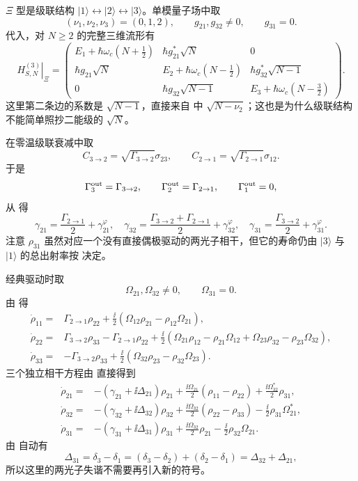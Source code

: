 \clearpage
\begin{exbox}[$\Xi$ 型]
$\Xi$ 型是级联结构 $|1\rangle\leftrightarrow|2\rangle\leftrightarrow|3\rangle$。单模量子场中取
\[
(\nu_1,\nu_2,\nu_3)=(0,1,2),
\qquad
g_{21},g_{32}\ne0,
\qquad
g_{31}=0.
\]
代入，对 $N\ge2$ 的完整三维流形有
\[
\left.H_{S,N}^{(3)}\right|_{\Xi}=
\begin{pmatrix}
E_1+\hbar\omega_c(N+\tfrac12)&\hbar g_{21}^*\sqrt N&0\\
\hbar g_{21}\sqrt N&E_2+\hbar\omega_c(N-\tfrac12)&\hbar g_{32}^*\sqrt{N-1}\\
0&\hbar g_{32}\sqrt{N-1}&E_3+\hbar\omega_c(N-\tfrac32)
\end{pmatrix}.
\]
这里第二条边的系数是 $\sqrt{N-1}$，直接来自 中 $\sqrt{N-\nu_2}$；这也是为什么级联结构不能简单照抄二能级的 $\sqrt N$。

在零温级联衰减中取
\[
C_{3\to2}=\sqrt{\Gamma_{3\to2}}\sigma_{23},
\qquad
C_{2\to1}=\sqrt{\Gamma_{2\to1}}\sigma_{12}.
\]
于是
\[
\Gamma_3^{\rm out}=\Gamma_{3\to2},
\qquad
\Gamma_2^{\rm out}=\Gamma_{2\to1},
\qquad
\Gamma_1^{\rm out}=0,
\]
从 得
\[
\gamma_{21}=\frac{\Gamma_{2\to1}}2+\gamma_{21}^{\varphi},
\quad
\gamma_{32}=\frac{\Gamma_{3\to2}+\Gamma_{2\to1}}2+\gamma_{32}^{\varphi},
\quad
\gamma_{31}=\frac{\Gamma_{3\to2}}2+\gamma_{31}^{\varphi}.
\]
注意 $\rho_{31}$ 虽然对应一个没有直接偶极驱动的两光子相干，但它的寿命仍由 $|3\rangle$ 与 $|1\rangle$ 的总出射率按 决定。

经典驱动时取
\[
\Omega_{21},\Omega_{32}\ne0,
\qquad
\Omega_{31}=0.
\]
由 得
\begin{align}
\dot\rho_{11}
={}&\Gamma_{2\to1}\rho_{22}
+\frac{\ii}{2}(\Omega_{12}\rho_{21}-\rho_{12}\Omega_{21}),\\
\dot\rho_{22}
={}&\Gamma_{3\to2}\rho_{33}-\Gamma_{2\to1}\rho_{22}
+\frac{\ii}{2}
(\Omega_{21}\rho_{12}-\rho_{21}\Omega_{12}
+\Omega_{23}\rho_{32}-\rho_{23}\Omega_{32}),\\
\dot\rho_{33}
={}&-\Gamma_{3\to2}\rho_{33}
+\frac{\ii}{2}(\Omega_{32}\rho_{23}-\rho_{32}\Omega_{23}).
\end{align}
三个独立相干方程由 直接得到
\begin{align}
\dot\rho_{21}
={}&-(\gamma_{21}+\ii\Delta_{21})\rho_{21}
+\frac{\ii\Omega_{21}}2(\rho_{11}-\rho_{22})
+\frac{\ii\Omega_{32}^*}{2}\rho_{31},\\
\dot\rho_{32}
={}&-(\gamma_{32}+\ii\Delta_{32})\rho_{32}
+\frac{\ii\Omega_{32}}2(\rho_{22}-\rho_{33})
-\frac{\ii}{2}\rho_{31}\Omega_{21}^*,\\
\dot\rho_{31}
={}&-(\gamma_{31}+\ii\Delta_{31})\rho_{31}
+\frac{\ii\Omega_{32}}2\rho_{21}
-\frac{\ii}{2}\rho_{32}\Omega_{21}.
\end{align}
由 自动有
\[
\Delta_{31}=\delta_3-\delta_1
=(\delta_3-\delta_2)+(\delta_2-\delta_1)
=\Delta_{32}+\Delta_{21},
\]
所以这里的两光子失谐不需要再引入新的符号。


\end{exbox}
